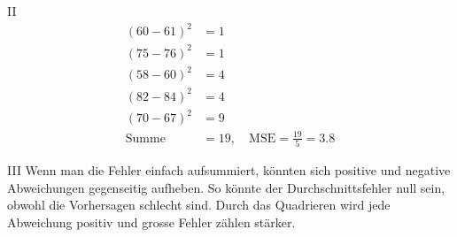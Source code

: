 \begin{aufgabe}{II}
\[
\begin{aligned}
(60 - 61)^2 &= 1 \\
(75 - 76)^2 &= 1 \\
(58 - 60)^2 &= 4 \\
(82 - 84)^2 &= 4 \\
(70 - 67)^2 &= 9 \\
\text{Summe} &= 19,\quad \text{MSE} = \frac{19}{5} = 3.8
\end{aligned}
\]
\end{aufgabe}

\begin{aufgabe}{III}
Wenn man die Fehler einfach aufsummiert, könnten sich positive und negative Abweichungen gegenseitig aufheben. So könnte der Durchschnittsfehler null sein, obwohl die Vorhersagen schlecht sind.  
Durch das Quadrieren wird jede Abweichung positiv und grosse Fehler zählen stärker.
\end{aufgabe}